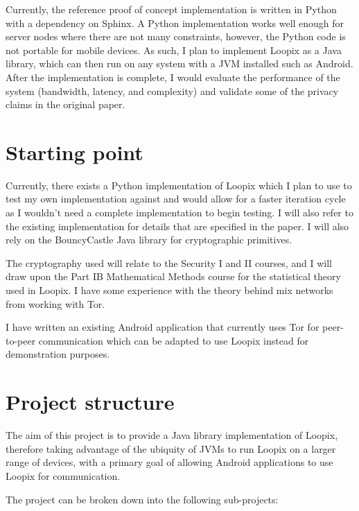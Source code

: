 \documentclass[12pt,a4paper,twoside]{article}
\begin{document}
	Currently, the reference proof of concept implementation is written in Python with a dependency on Sphinx\cite{danezis2009sphinx}. A Python implementation works well enough for server nodes where there are not many constraints, however, the Python code is not portable for mobile devices. As such, I plan to implement Loopix as a Java library, which can then run on any system with a JVM installed such as Android. After the implementation is complete, I would evaluate the performance of the system (bandwidth, latency, and complexity) and validate some of the privacy claims in the original paper.
	
	
	\section*{Starting point}
	
	
	Currently, there exists a Python implementation of Loopix which I plan to use to test my own implementation against and would allow for a faster iteration cycle as I wouldn't need a complete implementation to begin testing. I will also refer to the existing implementation for details that are specified in the paper. I will also rely on the BouncyCastle Java library for cryptographic primitives.
	
	The cryptography used will relate to the Security I and II courses, and I will draw upon the Part IB Mathematical Methods course for the statistical theory used in Loopix. I have some experience with the theory behind mix networks from working with Tor.
	
	I have written an existing Android application that currently uses Tor for peer-to-peer communication which can be adapted to use Loopix instead for demonstration purposes.
	
	\section*{Project structure}
	
	The aim of this project is to provide a Java library implementation of Loopix, therefore taking advantage of the ubiquity of JVMs to run Loopix on a larger range of devices, with a primary goal of allowing Android applications to use Loopix for communication.
	
	The project can be broken down into the following sub-projects:
	
\end{document}
